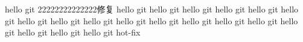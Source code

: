 hello git 22222222222222修复
hello git
hello git
hello git
hello git
hello git
hello git
hello git
hello git
hello git
hello git
hello git
hello git
hello git
hello git
hello git
hello git
hello git
hello git hot-fix


